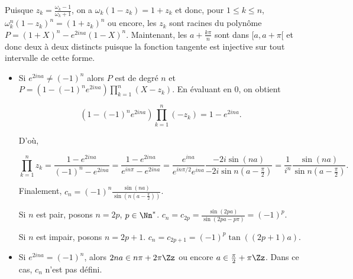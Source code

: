 {{Puisque $z_k=\frac{\omega_k-1}{\omega_k+1}$, on a $\omega_k(1-z_k)=1+z_k$ et donc, pour $1\leq k\leq n$, $\omega_k^n(1-z_k)^n=(1+z_k)^n$ ou encore, les $z_k$ sont racines du polynôme $P=(1+X)^n-e^{2ina}(1-X)^n$. Maintenant, les $a+\frac{k\pi}{n}$ sont dans $[a,a+\pi[$ et donc deux à deux distincts puisque la fonction tangente est injective sur tout intervalle de cette forme.

\begin{itemize}
\item[1er cas.] Si $e^{2ina}\neq(-1)^n$ alors $P$ est de degré $n$ et $P=(1-(-1)^ne^{2ina})\prod_{k=1}^{n}(X-z_k)$. En évaluant en $0$, on obtient

$$(1-(-1)^ne^{2ina})\prod_{k=1}^{n}(-z_k)=1-e^{2ina}.$$

D'où,

$$\prod_{k=1}^{n}z_k=\frac{1-e^{2ina}}{(-1)^n-e^{2ina}}=\frac{1-e^{2ina}}{e^{in\pi}-e^{2ina}}=\frac{e^{ina}}{e^{in\pi/2}e^{ina}}\frac{-2i\sin(na)}{-2i\sin n(a-\frac{\pi}{2})}=\frac{1}{i^n} \frac{\sin(na)}{\sin n(a-\frac{\pi}{2})}.$$

Finalement, $c_n=(-1)^n\frac{\sin(na)}{\sin(n(a-\frac{\pi}{2}))}$.

Si $n$ est pair, posons $n=2p$, $p\in\Nn^*$. $c_n=c_{2p}=\frac{\sin(2pa)}{\sin (2pa-p\pi)}=(-1)^p$.

Si $n$ est impair, posons $n=2p+1$. $c_n=c_{2p+1}=(-1)^p\tan((2p+1)a)$.
\item[2ème cas.] Si $e^{2ina}=(-1)^n$, alors $2na\in n\pi+2\pi\Zz$ ou encore $a\in\frac{\pi}{2}+\pi\Zz$. Dans ce cas, $c_n$ n'est pas défini.
\end{itemize}
}
}
